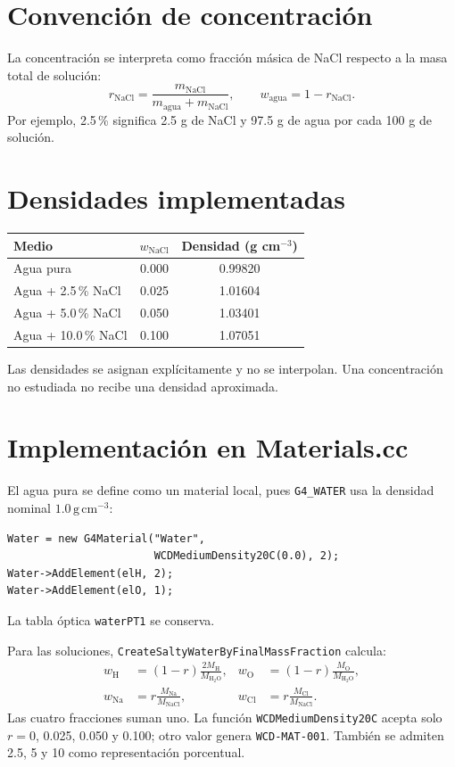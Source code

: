 \documentclass[11pt,a4paper]{article}
\newcommand{\codigo}[1]{\texttt{#1}}
\begin{document}
\section{Convención de concentración}
La concentración se interpreta como fracción másica de NaCl respecto a la masa
total de solución:
\begin{equation}
r_{\mathrm{NaCl}}=\frac{m_{\mathrm{NaCl}}}{m_{\mathrm{agua}}+m_{\mathrm{NaCl}}},
\qquad
w_{\mathrm{agua}}=1-r_{\mathrm{NaCl}}.
\end{equation}
Por ejemplo, 2.5\,\% significa 2.5 g de NaCl y 97.5 g de agua por cada
100 g de solución. 

\section{Densidades implementadas}
\begin{center}
\begin{tabular}{lcc}
\toprule
Medio & $w_{\mathrm{NaCl}}$ & Densidad (g cm$^{-3}$)\\
\midrule
Agua pura & 0.000 & 0.99820\\
Agua + 2.5\,\% NaCl & 0.025 & 1.01604\\
Agua + 5.0\,\% NaCl & 0.050 & 1.03401\\
Agua + 10.0\,\% NaCl & 0.100 & 1.07051\\
\bottomrule
\end{tabular}
\end{center}
Las densidades se asignan explícitamente y no se interpolan. Una concentración
no estudiada no recibe una densidad aproximada.

\section{Implementación en Materials.cc}
El agua pura se define como un material local, pues \codigo{G4\_WATER} usa la
densidad nominal $1.0\,\mathrm{g\,cm^{-3}}$:
\begin{lstlisting}
Water = new G4Material("Water",
                       WCDMediumDensity20C(0.0), 2);
Water->AddElement(elH, 2);
Water->AddElement(elO, 1);
\end{lstlisting}
La tabla óptica \codigo{waterPT1} se conserva.

Para las soluciones, \codigo{CreateSaltyWaterByFinalMassFraction} calcula:
\begin{align}
w_{\mathrm H}&=(1-r)\frac{2M_{\mathrm H}}{M_{\mathrm{H_2O}}},&
w_{\mathrm O}&=(1-r)\frac{M_{\mathrm O}}{M_{\mathrm{H_2O}}},\\
w_{\mathrm{Na}}&=r\frac{M_{\mathrm{Na}}}{M_{\mathrm{NaCl}}},&
w_{\mathrm{Cl}}&=r\frac{M_{\mathrm{Cl}}}{M_{\mathrm{NaCl}}}.
\end{align}
Las cuatro fracciones suman uno. La función
\codigo{WCDMediumDensity20C} acepta solo $r=0$, 0.025, 0.050 y 0.100; otro
valor genera \codigo{WCD-MAT-001}. También se admiten 2.5, 5 y 10 como
representación porcentual.
\end{document}
